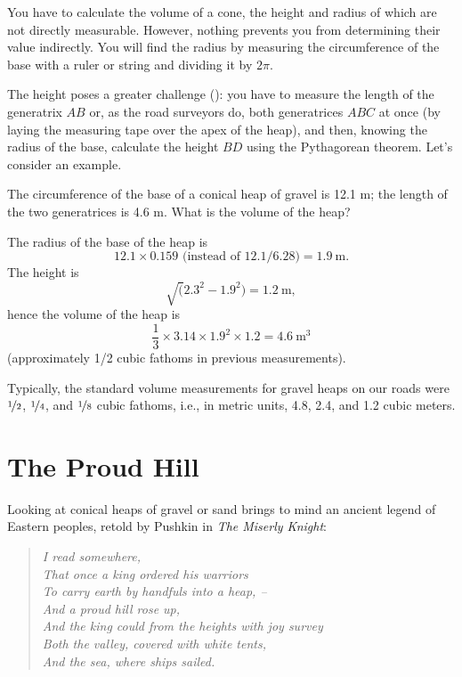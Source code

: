 You have to calculate the volume of a cone, the height and radius of which are not directly measurable. However, nothing prevents you from determining their value indirectly. You will find the radius by measuring the circumference of the base with a ruler or string and dividing it by $2\pi$. 

The height poses a greater challenge (): you have to measure the length of the generatrix $AB$ or, as the road surveyors do, both generatrices $ABC$ at once (by laying the measuring tape over the apex of the heap), and then, knowing the radius of the base, calculate the height $BD$ using the Pythagorean theorem. Let's consider an example.

\ques The circumference of the base of a conical heap of gravel is 12.1 m; the length of the two generatrices is 4.6 m. What is the volume of the heap?

\ans The radius of the base of the heap is 
\begin{equation*}%
12.1 \times 0.159 \,\, \text{(instead of 12.1/6.28)} = \SI{1.9}{\meter}.
\end{equation*}
The height is 
\begin{equation*}%
\sqrt(2.3^{2} - 1.9^{2}) =  \SI{1.2}{\meter},
\end{equation*}
hence the volume of the heap is 
\begin{equation*}%
\frac{1}{3} \times 3.14 \times 1.9^{2} \times 1.2 =  \SI{4.6}{\meter\cubed}
\end{equation*}
(approximately 1/2 cubic fathoms in previous measurements).

Typically, the standard volume measurements for gravel heaps on our roads were $\nicefrac{1}{2}$, $\nicefrac{1}{4}$, and $\nicefrac{1}{8}$ cubic fathoms, i.e., in metric units, 4.8, 2.4, and 1.2 cubic meters.
\clearpage


\section{The Proud Hill}
\label{sec-4.5}

Looking at conical heaps of gravel or sand brings to mind an ancient legend of Eastern peoples, retold by Pushkin in \emph{The Miserly Knight}:

\begin{quote}
\emph{I read somewhere,\\
That once a king ordered his warriors\\
To carry earth by handfuls into a heap, --\\
And a proud hill rose up,\\
And the king could from the heights with joy survey\\
Both the valley, covered with white tents,\\
And the sea, where ships sailed.}
\end{quote}

